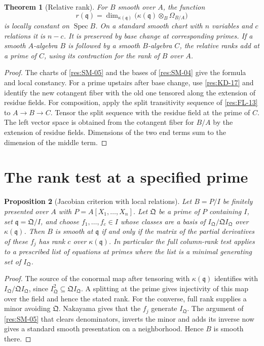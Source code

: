\documentclass[11pt,oneside,openany]{book}
\newtheorem{theorem}{Theorem}[chapter]
\newtheorem{proposition}[theorem]{Proposition}
\theoremstyle{definition}
\theoremstyle{remark}
\begin{document}
\begin{theorem}[Relative rank]
\label{res:SM-09}
For $B$ smooth over $A$, the function
\[
  r(\mathfrak q)=
  \dim_{\kappa(\mathfrak q)}
    \bigl(\kappa(\mathfrak q)\otimes_B\Omega_{B/A}\bigr)
\]
is locally constant on $\operatorname{Spec}B$. On a standard
smooth chart with $n$ variables and $c$ relations it is $n-c$.
It is preserved by base change at corresponding primes.
If a smooth $A$-algebra $B$ is followed by a smooth $B$-algebra
$C$, the relative ranks add at a prime of $C$, using its
contraction for the rank of $B$ over $A$.
\end{theorem}

\begin{proof}
The charts of \ref{res:SM-05} and the bases of \ref{res:SM-04}
give the formula and local constancy. For a prime upstairs
after base change, use \ref{res:KD-17} and identify the new
cotangent fiber with the old one tensored along the extension
of residue fields. For composition, apply the split
transitivity sequence of \ref{res:FL-13} to $A\to B\to C$.
Tensor the split sequence with the residue field at the prime
of $C$. The left vector space is obtained from the cotangent
fiber for $B/A$ by the extension of residue fields. Dimensions
of the two end terms sum to the dimension of the middle term.
\end{proof}

\section{The rank test at a specified prime}

\begin{proposition}[Jacobian criterion with local relations]
\label{res:SM-10}
Let $B=P/I$ be finitely presented over $A$ with
$P=A[X_1,\ldots,X_n]$. Let $\mathfrak Q$ be a prime of $P$
containing $I$, set $\mathfrak q=\mathfrak Q/I$, and choose
$f_1,\ldots,f_c\in I$ whose classes are a basis of
$I_{\mathfrak Q}/\mathfrak Q I_{\mathfrak Q}$
over $\kappa(\mathfrak q)$. Then $B$ is smooth at $\mathfrak q$
if and only if the matrix of the partial derivatives of these
$f_j$ has rank $c$ over $\kappa(\mathfrak q)$. In particular
the full column-rank test applies to a prescribed list of
equations at primes where the list is a minimal generating
set of $I_{\mathfrak Q}$.
\end{proposition}

\begin{proof}
The source of the conormal map after tensoring with
$\kappa(\mathfrak q)$ identifies with
$I_{\mathfrak Q}/\mathfrak Q I_{\mathfrak Q}$, since
$I_{\mathfrak Q}^2\subseteq\mathfrak Q I_{\mathfrak Q}$.
A splitting at the prime gives injectivity of this map over
the field and hence the stated rank. For the converse, full
rank supplies a minor avoiding $\mathfrak Q$. Nakayama gives
that the $f_j$ generate $I_{\mathfrak Q}$. The argument of
\ref{res:SM-05} that clears denominators, inverts the minor
and adds its inverse now gives a standard smooth presentation
on a neighborhood. Hence $B$ is smooth there.
\end{proof}
\end{document}
